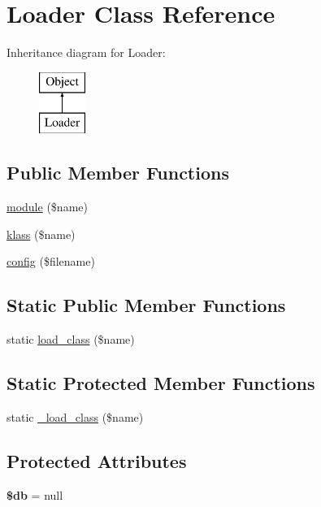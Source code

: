 \hypertarget{class_loader}{
\section{Loader Class Reference}
\label{class_loader}
}
Inheritance diagram for Loader:\begin{figure}[H]
\begin{center}
\leavevmode
\includegraphics[height=2.000000cm]{class_loader}
\end{center}
\end{figure}
\subsection*{Public Member Functions}
\begin{DoxyCompactItemize}
\item 
\hyperlink{class_loader_abc6be440e54582b55d57a55b0a20415d}{module} (\$name)
\item 
\hyperlink{class_loader_a4685e3ef6b0bf19ebdbe9ecc502e5dc1}{klass} (\$name)
\item 
\hyperlink{class_loader_aaad68183dd74b4723de4b7f3ec1195e3}{config} (\$filename)
\end{DoxyCompactItemize}
\subsection*{Static Public Member Functions}
\begin{DoxyCompactItemize}
\item 
static \hyperlink{class_loader_a72a2a8fb114e735a9b24ca34054e2f2c}{load\_\-class} (\$name)
\end{DoxyCompactItemize}
\subsection*{Static Protected Member Functions}
\begin{DoxyCompactItemize}
\item 
static \hyperlink{class_loader_ae36ffb3324beb3deb2ca786111c4906c}{\_\-load\_\-class} (\$name)
\end{DoxyCompactItemize}
\subsection*{Protected Attributes}
\begin{DoxyCompactItemize}
\item 
\hypertarget{class_object_a1fa3127fc82f96b1436d871ef02be319}{
{\bfseries \$db} = null}
\label{class_object_a1fa3127fc82f96b1436d871ef02be319}

\end{DoxyCompactItemize}


